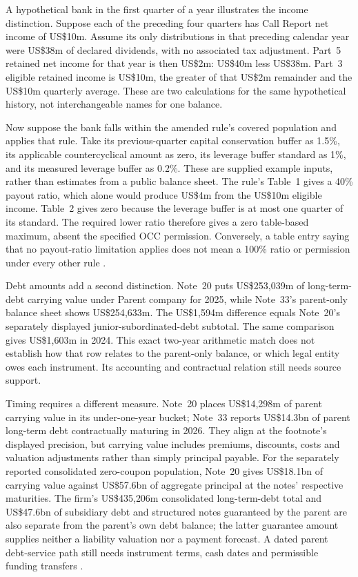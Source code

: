A hypothetical bank in the first quarter of a year illustrates the income
distinction. Suppose each of the preceding four quarters has Call Report net
income of US\$10m. Assume its only distributions in that preceding calendar
year were US\$38m of declared dividends, with no associated tax adjustment.
Part~5 retained net income for that year is then US\$2m: US\$40m less
US\$38m. Part~3 eligible retained income is US\$10m, the greater of that
US\$2m remainder and the US\$10m quarterly average. These are two calculations
for the same hypothetical history, not interchangeable names for one balance.

Now suppose the bank falls within the amended rule's covered population and
applies that rule. Take its previous-quarter capital conservation buffer as
1.5\%, its applicable countercyclical amount as zero, its leverage buffer
standard as 1\%, and its measured leverage buffer as 0.2\%. These are supplied
example inputs, rather than estimates from a public balance sheet. The rule's Table~1
gives a 40\% payout ratio, which alone would produce US\$4m from the
US\$10m eligible income. Table~2 gives zero because the leverage buffer is
at most one quarter of its standard. The required lower ratio therefore gives
a zero table-based maximum, absent the specified OCC permission. Conversely,
a table entry saying that no payout-ratio limitation applies does not mean a
100\% ratio or permission under every other rule
\citep[12~CFR~3.11(a)(4), (c), Tables~1--2]{occcapitalpayout2026}.


Debt amounts add a second distinction. Note~20 puts US\$253{,}039m of
long-term-debt carrying value under Parent company for 2025, while Note~33's
parent-only balance sheet shows US\$254{,}633m. The US\$1{,}594m difference
equals Note~20's separately displayed junior-subordinated-debt subtotal. The
same comparison gives US\$1{,}603m in 2024. This exact two-year arithmetic
match does not establish how that row relates to the parent-only balance,
or which legal entity owes each instrument. Its accounting and
contractual relation still needs source support.

Timing requires a different measure. Note~20 places US\$14{,}298m of parent
carrying value in its under-one-year bucket; Note~33 reports US\$14.3bn of
parent long-term debt contractually maturing in 2026. They align at the
footnote's displayed precision, but carrying value includes premiums,
discounts, costs and valuation adjustments rather than simply principal
payable. For the separately reported consolidated zero-coupon population,
Note~20 gives US\$18.1bn of carrying value against US\$57.6bn of aggregate
principal at the notes' respective maturities. The firm's US\$435{,}206m
consolidated long-term-debt total and US\$47.6bn of subsidiary debt and
structured notes guaranteed by the parent are also separate from the parent's
own debt balance; the latter guarantee amount supplies neither a liability
valuation nor a payment forecast. A dated parent debt-service path still needs
instrument terms, cash dates and permissible funding transfers
\citep[pp.~281--282, 310--311]{jpmorgan2025tenk}.

